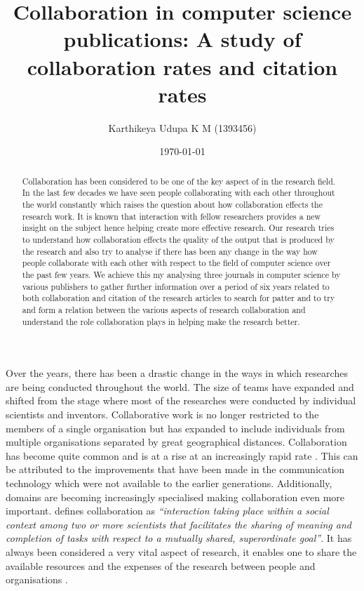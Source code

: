 \documentclass[12pt]{article}
\title{Collaboration in computer science publications: A study of collaboration rates and citation rates}
\author{Karthikeya Udupa K M (1393456)}
\date{\today}
\begin{document}
\maketitle


\begin{abstract}

\noindent
Collaboration has been considered to be one of the key aspect of in the research field. In the last few decades we have seen people collaborating with each other throughout the world constantly which raises the question about how collaboration effects the research work. It is known that interaction with fellow researchers provides a new insight on the subject hence helping create more effective research. Our research tries to understand how collaboration  effects the quality of the output that is produced by the research and also try to analyse if there has been any change in the way how people collaborate with each other with respect to the field of computer science over the past few years. We achieve this my analysing three journals in computer science by various publishers to gather further information over a period of six years related to both collaboration and citation of the research articles to search for patter and to try and form a relation between the various aspects of research collaboration and understand the role collaboration plays in helping make the research better.




\end{abstract}


\noindent
Over the years, there has been a drastic change in the ways in which researches are being conducted throughout the world. The size of teams have expanded and shifted from the stage where most of the researches were conducted by individual scientists and inventors. Collaborative work is no longer restricted to the members of a single organisation but has expanded to include individuals from multiple organisations separated by great geographical distances. Collaboration has become quite common and is at a rise at an increasingly rapid rate \cite{adams2005scientific}. This can be attributed to the improvements that have been made in the communication technology which were not available to the earlier generations. Additionally, domains are becoming increasingly specialised making collaboration even more important. \cite{sonnenwald2007scientific} defines collaboration as \textit{``interaction taking place within a social context among two or more scientists that facilitates the sharing of meaning and completion of tasks with respect to a mutually shared, superordinate goal''}. It has always been considered a very vital aspect of research, it enables one to share the available resources and the expenses of the research between people and organisations \cite{figg2006scientific}.
\end{document}
